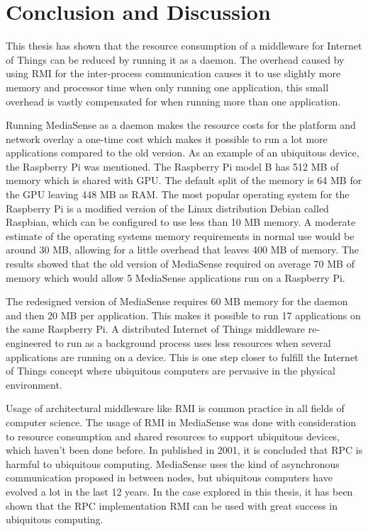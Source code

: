 \chapter{Conclusion and Discussion}

This thesis has shown that the resource consumption of a middleware for Internet of Things can be reduced by running it as a daemon. The overhead caused by using RMI for the inter-process communication causes it to use slightly more memory and processor time when only running one application, this small overhead is vastly compensated for when running more than one application. 

Running MediaSense as a daemon makes the resource costs for the platform and network overlay a one-time cost which makes it possible to run a lot more applications compared to the old version. As an example of an ubiquitous device, the Raspberry Pi \cite{rpiweb} was mentioned. The Raspberry Pi model B has 512 MB of memory which is shared with GPU. The default split of the memory is 64 MB for the GPU leaving 448 MB as RAM. The most popular operating system for the Raspberry Pi is a modified version of the Linux distribution Debian called Raspbian, which can be configured to use less than 10 MB memory. A moderate estimate of the operating systems memory requirements in normal use would be around 30 MB, allowing for a little overhead that leaves 400 MB of memory. The results showed that the old version of MediaSense required on average 70 MB of memory which would allow 5 MediaSense applications run on a Raspberry Pi.

The redesigned version of MediaSense requires 60 MB memory for the daemon and then 20 MB per application. This makes it possible to run 17 applications on the same Raspberry Pi.
A distributed Internet of Things middleware re-engineered to run as a background process uses less resources when several applications are running on a device. This is one step closer to fulfill the Internet of Things concept where ubiquitous computers are pervasive in the physical environment.

Usage of architectural middleware like RMI is common practice in all fields of computer science. The usage of RMI in MediaSense was done with consideration to resource consumption and shared resources to support ubiquitous devices, which haven't been done before. In \cite{ubiqrpc} published in 2001, it is concluded that RPC is harmful to ubiquitous computing. MediaSense uses the kind of asynchronous communication proposed in \cite{ubiqrpc} between nodes, but ubiquitous computers have evolved a lot in the last 12 years. In the case explored in this thesis, it has been shown that the RPC implementation RMI can be used with great success in ubiquitous computing.

